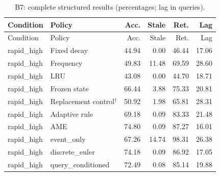 \begin{longtable}{llrrrr}\caption{B7: complete structured results (percentages; lag in queries).}\label{tab:B7}\\\toprule Condition & Policy & Acc. & Stale & Ret. & Lag\\\midrule\endfirsthead\toprule Condition & Policy & Acc. & Stale & Ret. & Lag\\\midrule\endhead
rapid\_high & Fixed decay & 44.94 & 0.00 & 46.44 & 17.06\\
rapid\_high & Frequency & 49.83 & 11.48 & 69.59 & 28.60\\
rapid\_high & LRU & 43.08 & 0.00 & 44.70 & 18.71\\
rapid\_high & Frozen state & 66.44 & 3.88 & 75.33 & 20.81\\
rapid\_high & Replacement control$^{\dagger}$ & 50.92 & 1.98 & 65.81 & 28.31\\
rapid\_high & Adaptive rule & 69.18 & 0.09 & 83.33 & 21.48\\
rapid\_high & AME & 74.80 & 0.09 & 87.27 & 16.01\\
rapid\_high & event\_only & 67.26 & 14.74 & 98.31 & 26.38\\
rapid\_high & discrete\_euler & 74.18 & 0.09 & 86.92 & 17.05\\
rapid\_high & query\_conditioned & 72.49 & 0.08 & 85.14 & 19.88\\
\bottomrule\end{longtable}
